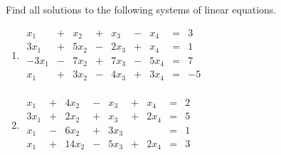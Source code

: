 \documentclass{ximera}
\begin{document}
\begin{problem}\label{prb:systems_review}
Find all solutions to the following systems of linear equations.

\begin{enumerate}
\item

$\begin{array}{rlrlrlrcr}
	  x_1 & + &  x_2 & + &  x_3 & - &  x_4 & = &  3 \\
	 3x_1 & + & 5x_2 & - & 2x_3 & + &  x_4 & = &  1 \\
	-3x_1 & - & 7x_2 & + & 7x_3 & - & 5x_4 & = &  7 \\
	  x_1 & + & 3x_2 & - & 4x_3 & + & 3x_4 & = & -5 \\
\end{array}$


\item

$\begin{array}{rlrlrlrcr}
	  x_1 & + &  4x_2 & - &   x_3 & + &   x_4 & = &  2 \\
	 3x_1 & + &  2x_2 & + &   x_3 & + &  2x_4 & = &  5 \\
	  x_1 & - &  6x_2 & + &  3x_3 &   &       & = &  1 \\
	  x_1 & + & 14x_2 & - &  5x_3 & + &  2x_4 & = &  3 \\
\end{array}$

\end{enumerate}

\end{problem}
\end{document}
